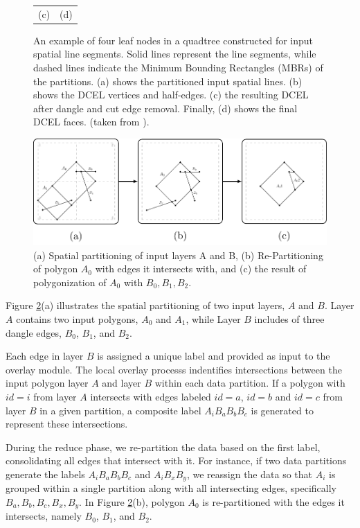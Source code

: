 \begin{figure}
\begin{tabular}{cc}
         (c) & (d) \\
     \end{tabular}
     \caption{An example of four leaf nodes in a quadtree constructed for input spatial line segments. Solid lines represent the line segments, while dashed lines indicate the Minimum Bounding Rectangles (MBRs) of the partitions. (a) shows the partitioned input spatial lines. (b) shows the DCEL vertices and half-edges. (c) the resulting DCEL after  dangle and cut edge removal.  Finally, (d) shows the final DCEL faces. (taken from \cite{abdelhafeez_ddcel_2023}).} \label{fig:polygonization}
 \end{figure}

 \begin{figure}
    \centering
    \includegraphics[width=\textwidth]{chapterExtension/dangles_cuts/DAC}
    \caption{(a) Spatial partitioning of input layers A and B, (b) Re-Partitioning of polygon $A_0$ with edges it intersects with, and (c) the result of polygonization of $A_0$ with $B_0, B_1, B_2$.} \label{fig:dangles_cuts}
 \end{figure}

 Figure \ref{fig:dangles_cuts}(a) illustrates the spatial partitioning of two input layers, $A$ and $B$. Layer $A$ contains two input polygons, $A_0$ and $A_1$, while Layer $B$ includes of three dangle edges, $B_0$, $B_1$, and $B_2$.
 
 Each edge in layer $B$ is assigned a unique label and provided as input to the overlay module.  The local overlay processs indentifies intersections between the input polygon layer $A$ and layer $B$ within each data partition.  If a polygon with $id = i$ from layer $A$ intersects with edges labeled $id = a$, $id = b$ and $id = c$ from layer $B$ in a given partition, a composite label $A_{i} B_{a} B_{b} B_{c}$ is generated to represent these intersections.  
 
During the reduce phase, we re-partition the data based on the first label, consolidating all edges that intersect with it. For instance, if two data partitions generate the labels $A_{i} B_{a} B_{b} B_{c}$ and $A_{i} B_{x} B_{y}$, we reassign the data so that $A_{i}$ is grouped within a single partition along with all intersecting edges, specifically $B_{a}, B_{b}, B_{c}, B_{x}, B_{y}$.  In Figure \ref{fig:dangles_cuts}(b), polygon $A_0$ is re-partitioned with the edges it intersects, namely $B_0$, $B_1$, and $B_2$.

